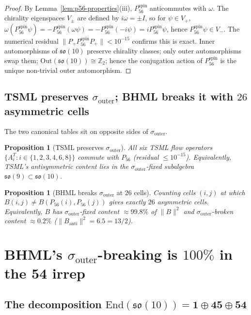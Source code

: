 \documentclass[11pt,reqno]{amsart}
\newtheorem{proposition}[theorem]{Proposition}
\theoremstyle{definition}
\newcommand{\Z}{\mathbb{Z}}
\newcommand{\so}{\mathfrak{so}}
\newcommand{\TSML}{T}
\newcommand{\BHML}{B}
\newcommand{\Psix}{P_{56}}
\newcommand{\Psixspin}{P_{56}^{\mathrm{spin}}}
\newcommand{\sout}{\sigma_{\mathrm{outer}}}
\begin{document}
\begin{proof}
By Lemma~\ref{lem:p56-properties}(iii), $\Psixspin$ anticommutes
with $\omega$. The chirality eigenspaces $V_\pm$ are defined by
$i\omega = \pm I$, so for $\psi \in V_+$, $\omega(\Psixspin \psi)
= -\Psixspin (\omega \psi) = -\Psixspin (-i \psi) = i \Psixspin
\psi$, hence $\Psixspin \psi \in V_-$. The numerical residual
$\|P_+ \Psixspin P_+\| < 10^{-15}$ confirms this is exact.
Inner automorphisms of $\so(10)$ preserve chirality classes; only
outer automorphisms swap them; $\mathrm{Out}(\so(10)) \cong \Z_2$;
hence the conjugation action of $\Psixspin$ is the unique
non-trivial outer automorphism.
\end{proof}

\subsection{TSML preserves $\sout$; BHML breaks it with $26$
asymmetric cells}

The two canonical tables sit on opposite sides of $\sout$.

\begin{proposition}[TSML preserves $\sout$]
\label{prop:tsml-preserves}
All six TSML flow operators $\{A^\TSML_i : i \in \{1, 2, 3, 4, 6,
8\}\}$ commute with $\Psix$ (residual $\le 10^{-15}$). Equivalently,
TSML's antisymmetric content lies in the $\sout$-fixed subalgebra
$\so(9) \subset \so(10)$.
\end{proposition}

\begin{proposition}[BHML breaks $\sout$ at $26$ cells]
\label{prop:bhml-breaks}
Counting cells $(i, j)$ at which $\BHML(i, j) \neq \BHML(\Psix(i),
\Psix(j))$ gives exactly $26$ asymmetric cells. Equivalently,
$\BHML$ has $\sout$-fixed content $\approx 99.8\%$ of $\|B\|^2$
and $\sout$-broken content $\approx 0.2\%$ ($\|B_{\mathrm{anti}}\|^2
= 6.5 = 13/2$).
\end{proposition}

\section{BHML's $\sout$-breaking is $100\%$ in the $\mathbf{54}$
irrep}
\label{sec:54}

\subsection{The decomposition $\mathrm{End}(\so(10)) =
\mathbf{1} \oplus \mathbf{45} \oplus \mathbf{54}$}
\end{document}
